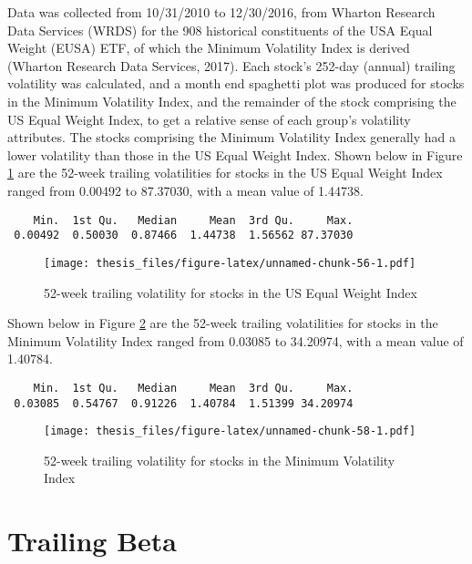 \documentclass[12pt,twoside]{reedthesis}
\theoremstyle{definition}
\theoremstyle{definition}
\theoremstyle{definition}
\theoremstyle{remark}
\begin{document}
Data was collected from 10/31/2010 to 12/30/2016, from Wharton Research
Data Services (WRDS) for the 908 historical constituents of the USA
Equal Weight (EUSA) ETF, of which the Minimum Volatility Index is
derived (Wharton Research Data Services, 2017). Each stock's 252-day
(annual) trailing volatility was calculated, and a month end spaghetti
plot was produced for stocks in the Minimum Volatility Index, and the
remainder of the stock comprising the US Equal Weight Index, to get a
relative sense of each group's volatility attributes. The stocks
comprising the Minimum Volatility Index generally had a lower volatility
than those in the US Equal Weight Index. Shown below in Figure
\ref{fig:vol1} are the 52-week trailing volatilities for stocks in the
US Equal Weight Index ranged from 0.00492 to 87.37030, with a mean value
of 1.44738.
\begin{verbatim}
    Min.  1st Qu.   Median     Mean  3rd Qu.     Max. 
 0.00492  0.50030  0.87466  1.44738  1.56562 87.37030 
\end{verbatim}
\begin{figure}[htbp]
\centering
\texttt{[image: thesis\_files/figure-latex/unnamed-chunk-56-1.pdf]}
\caption{\label{fig:unnamed-chunk-56}52-week trailing volatility for stocks
in the US Equal Weight Index\label{fig:vol1}}
\end{figure}
\clearpage  Shown below in Figure \ref{fig:vol2} are the 52-week
trailing volatilities for stocks in the Minimum Volatility Index ranged
from 0.03085 to 34.20974, with a mean value of 1.40784.
\begin{verbatim}
    Min.  1st Qu.   Median     Mean  3rd Qu.     Max. 
 0.03085  0.54767  0.91226  1.40784  1.51399 34.20974 
\end{verbatim}
\begin{figure}[htbp]
\centering
\texttt{[image: thesis\_files/figure-latex/unnamed-chunk-58-1.pdf]}
\caption{\label{fig:unnamed-chunk-58}52-week trailing volatility for stocks
in the Minimum Volatility Index\label{fig:vol2}}
\end{figure}
\clearpage 

\section{Trailing Beta}\label{trailing-beta}
\end{document}

